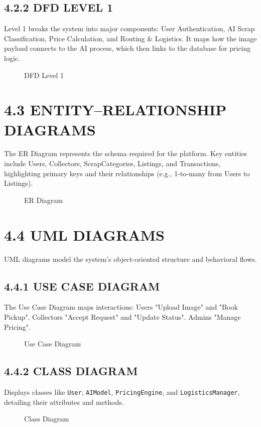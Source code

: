 \subsection{4.2.2 DFD LEVEL 1}
Level 1 breaks the system into major components: User Authentication, AI Scrap Classification, Price Calculation, and Routing \& Logistics. It maps how the image payload connects to the AI process, which then links to the database for pricing logic.
\begin{figure}[H]
    \centering
    \vspace{4cm}
    \caption{DFD Level 1}
\end{figure}

\section{4.3 ENTITY–RELATIONSHIP DIAGRAMS}
The ER Diagram represents the schema required for the platform. Key entities include Users, Collectors, ScrapCategories, Listings, and Transactions, highlighting primary keys and their relationships (e.g., 1-to-many from Users to Listings).
\begin{figure}[H]
    \centering
    \vspace{4cm}
    \caption{ER Diagram}
\end{figure}

\section{4.4 UML DIAGRAMS}
UML diagrams model the system’s object-oriented structure and behavioral flows.

\subsection{4.4.1 USE CASE DIAGRAM}
The Use Case Diagram maps interactions: Users "Upload Image" and "Book Pickup". Collectors "Accept Request" and "Update Status". Admins "Manage Pricing".
\begin{figure}[H]
    \centering
    \vspace{4cm}
    \caption{Use Case Diagram}
\end{figure}

\subsection{4.4.2 CLASS DIAGRAM}
Displays classes like \texttt{User}, \texttt{AIModel}, \texttt{PricingEngine}, and \texttt{LogisticsManager}, detailing their attributes and methods.
\begin{figure}[H]
    \centering
    \vspace{4cm}
    \caption{Class Diagram}
\end{figure}

